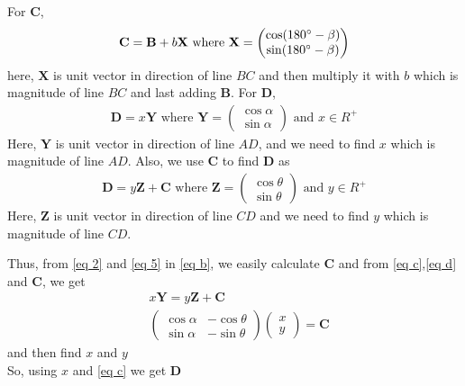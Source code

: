 \documentclass{beamer}
\newcommand{\myvec}[1]{\ensuremath{\begin{pmatrix}#1\end{pmatrix}}}
\renewcommand{\vec}[1]{\mathbf{#1}}
\begin{document}
\begin{frame}
\begin{lemma}
For $\vec{C}$, 
\begin{align}
\vec{C} =\vec{B} + b\vec{X} \text{ where } \vec{X} = \myvec{\cos (180\degree -\beta)\\\sin (180\degree -\beta)} \label{eq b}
\end{align}
here, $\vec{X}$ is unit vector in direction of line $BC$ and then multiply it with $b$ which is magnitude of line $BC$ and last adding $\vec{B}$. For $\vec{D}$,
\begin{align}
\vec{D} = x\vec{Y} \text{ where } \vec{Y} = \myvec{\cos\alpha\\\sin \alpha}\text{ and } x \in R^{+} \label{eq c}
\end{align}
Here, $\vec{Y}$ is unit vector in direction of line $AD$, and we need to find $x$ which is magnitude of line $AD$. Also, we use $\vec{C}$ to find $\vec{D}$ as 
\begin{align}
\vec{D} = y\vec{Z}+\vec{C} \text{ where } \vec{Z} =  \myvec{\cos\theta\\\sin\theta} \text{ and }y \in R^{+} \label{eq d}
\end{align}
Here, $\vec{Z}$ is unit vector in direction of line $CD$ and we need to find $y$ which is magnitude of line $CD$.
\end{lemma}
\end{frame}
\begin{frame}
Thus, 
from  \eqref{eq 2} and \eqref{eq 5} in \eqref{eq b}, we easily calculate $\vec{C}$ and from \eqref{eq c},\eqref{eq d} and $\vec{C}$, we get 
\begin{align}
&x\vec{Y} = y\vec{Z}+\vec{C}\\
&\myvec{\cos\alpha & -\cos\theta \\ \sin\alpha & -\sin\theta} \myvec{x \\ y} = \vec{C}
\end{align}
and then find $x$ and $y$\\
So, using $x$ and \eqref{eq c} we get $\vec{D}$
\end{frame}
\end{document}
